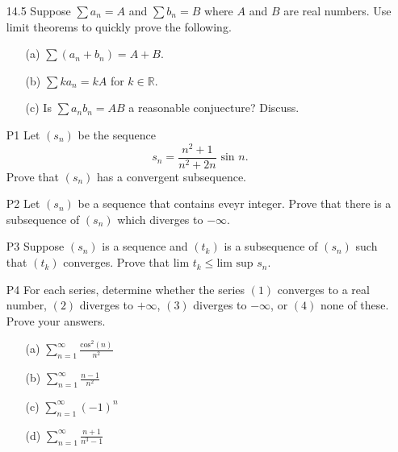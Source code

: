 \documentclass{article}
\begin{document}
\begin{itemize}
\begin{itemize}
          \end{itemize}
    \item [14.5] Suppose $\sum a_n=A$ and $\sum b_n=B$ where $A$ and $B$ are real numbers. Use limit theorems to quickly prove the following.
          \begin{itemize}
              \item [(a)] $\sum(a_n+b_n)=A+B$.
              \item [(b)] $\sum ka_n=kA$ for $k\in\mathbb{R}$.
              \item [(c)] Is $\sum a_nb_n=AB$ a reasonable conjuecture? Discuss.
          \end{itemize}
    \item [P1] Let $(s_n)$ be the sequence \[s_n=\dfrac{n^2+1}{n^2+2n}\text{ sin }n.\] Prove that $(s_n)$ has a convergent subsequence.
    \item [P2] Let $(s_n)$ be a sequence that contains eveyr integer. Prove that there is a subsequence of $(s_n)$ which diverges to $-\infty$.
    \item [P3] Suppose $(s_n)$ is a sequence and $(t_k)$ is a subsequence of $(s_n)$ such that $(t_k)$ converges. Prove that $\text{lim }t_k\leq\text{lim sup }s_n$.
    \item [P4] For each series, determine whether the series $(1)$ converges to a real number, $(2)$ diverges to $+\infty$, $(3)$ diverges to $-\infty$, or $(4)$ none of these. Prove your answers.
          \begin{itemize}
              \item [(a)] $\sum_{n=1}^\infty \frac{\text{cos}^2(n)}{n^2}$
              \item [(b)] $\sum_{n=1}^\infty \frac{n-1}{n^2}$
              \item [(c)] $\sum_{n=1}^\infty (-1)^n$
              \item [(d)] $\sum_{n=1}^\infty \frac{n+1}{n^3-1}$
          \end{itemize}
\end{itemize}
\end{document}
